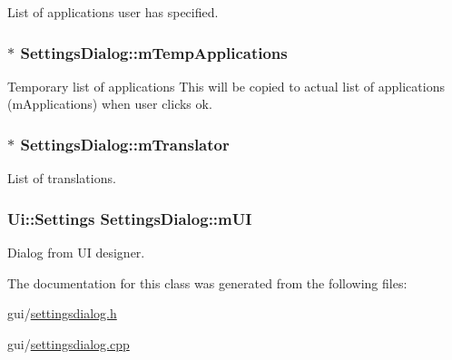 List of applications user has specified. 

\hypertarget{class_settings_dialog_a89e52a00a50a7ebabef52bc9d40be49e}{
\subsubsection[{m\-Temp\-Applications}]{$\ast$ Settings\-Dialog\-::m\-Temp\-Applications\hspace{0.3cm}{\ttfamily [protected]}}}\label{class_settings_dialog_a89e52a00a50a7ebabef52bc9d40be49e}


Temporary list of applications This will be copied to actual list of applications (m\-Applications) when user clicks ok. 

\hypertarget{class_settings_dialog_a96aa44d2e7a49fb64141356b8945ed3f}{
\subsubsection[{m\-Translator}]{$\ast$ Settings\-Dialog\-::m\-Translator\hspace{0.3cm}{\ttfamily [protected]}}}\label{class_settings_dialog_a96aa44d2e7a49fb64141356b8945ed3f}


List of translations. 

\hypertarget{class_settings_dialog_af54179fb3fb2ace2ff4c6acc28a0efbf}{
\subsubsection[{m\-U\-I}]{\setlength{\rightskip}{0pt plus 5cm}Ui\-::\-Settings Settings\-Dialog\-::m\-U\-I\hspace{0.3cm}{\ttfamily [protected]}}}\label{class_settings_dialog_af54179fb3fb2ace2ff4c6acc28a0efbf}


Dialog from U\-I designer. 



The documentation for this class was generated from the following files\-:\begin{DoxyCompactItemize}
\item 
gui/\hyperlink{settingsdialog_8h}{settingsdialog.\-h}\item 
gui/\hyperlink{settingsdialog_8cpp}{settingsdialog.\-cpp}\end{DoxyCompactItemize}

